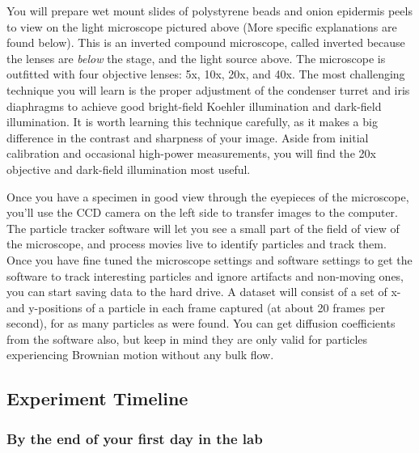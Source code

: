 \documentclass{../lab}
\begin{document}
You will prepare wet mount slides of polystyrene beads and onion epidermis peels to view on the light microscope pictured above (More specific explanations are found below). This is an inverted compound microscope, called inverted because the lenses are \emph{below} the stage, and the light source above. The microscope is outfitted with four objective lenses: 5x, 10x, 20x, and 40x. The most challenging technique you will learn is the proper adjustment of the condenser turret and iris diaphragms to achieve good bright-field Koehler illumination and dark-field illumination. It is worth learning this technique carefully, as it makes a big difference in the contrast and sharpness of your image. Aside from initial calibration and occasional high-power measurements, you will find the 20x objective and dark-field illumination most useful.

Once you have a specimen in good view through the eyepieces of the microscope, you'll use the CCD camera on the left side to transfer images to the computer. The particle tracker software will let you see a small part of the field of view of the microscope, and process movies live to identify particles and track them. Once you have fine tuned the microscope settings and software settings to get the software to track interesting particles and ignore artifacts and non-moving ones, you can start saving data to the hard drive. A dataset will consist of a set of x- and y-positions of a particle in each frame captured (at about 20 frames per second), for as many particles as were found. You can get diffusion coefficients from the software also, but keep in mind they are only valid for particles experiencing Brownian motion without any bulk flow.

\subsection{Experiment Timeline}

\subsubsection{By the end of your first day in the lab}
\end{document}
